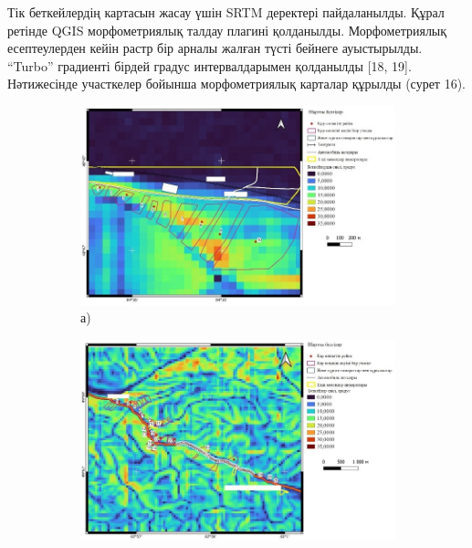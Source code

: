 \begin{multicols}{2}
Тік беткейлердің картасын жасау үшін SRTM деректері пайдаланылды. Құрал
ретінде QGIS морфометриялық талдау плагині қолданылды. Морфометриялық
есептеулерден кейін растр бір арналы жалған түсті бейнеге ауыстырылды.
``Turbo'' градиенті бірдей градус интервалдарымен қолданылды {[}18,
19{]}. Нәтижесінде участкелер бойынша морфометриялық карталар құрылды
(сурет 16).
\end{multicols}

\begin{figure}[H]
    \centering
    \begin{subfigure}[t]{0.42\textwidth}
        \centering
        \includegraphics[width=\textwidth]{media/ict2/image219}
        \caption*{а)}
    \end{subfigure}
    \begin{subfigure}[t]{0.42\textwidth}
        \centering
        \includegraphics[width=\textwidth]{media/ict2/image220}

\end{subfigure}
\end{figure}
